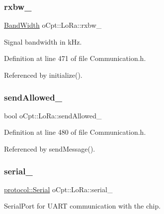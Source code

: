 \subsubsection{\texorpdfstring{rxbw\+\_\+}{rxbw\_}}
{\footnotesize\ttfamily \hyperlink{classo_cpt_1_1_lo_ra_abb27d22a584625eea0339906152c031d}{Band\+Width} o\+Cpt\+::\+Lo\+Ra\+::rxbw\+\_\+\hspace{0.3cm}{\ttfamily [protected]}}



Signal bandwidth in k\+Hz. 



Definition at line 471 of file Communication.\+h.



Referenced by initialize().

\hypertarget{classo_cpt_1_1_lo_ra_a40be67af15ddcf86fe017fa356084293}{}\label{classo_cpt_1_1_lo_ra_a40be67af15ddcf86fe017fa356084293} 
\subsubsection{\texorpdfstring{send\+Allowed\+\_\+}{sendAllowed\_}}
{\footnotesize\ttfamily bool o\+Cpt\+::\+Lo\+Ra\+::send\+Allowed\+\_\+\hspace{0.3cm}{\ttfamily [protected]}}



Definition at line 480 of file Communication.\+h.



Referenced by send\+Message().

\hypertarget{classo_cpt_1_1_lo_ra_ab349fec280811fd5172f91652abe2775}{}\label{classo_cpt_1_1_lo_ra_ab349fec280811fd5172f91652abe2775} 
\subsubsection{\texorpdfstring{serial\+\_\+}{serial\_}}
{\footnotesize\ttfamily \hyperlink{classo_cpt_1_1protocol_1_1_serial}{protocol\+::\+Serial} o\+Cpt\+::\+Lo\+Ra\+::serial\+\_\+\hspace{0.3cm}{\ttfamily [protected]}}



Serial\+Port for U\+A\+RT communication with the chip. 



